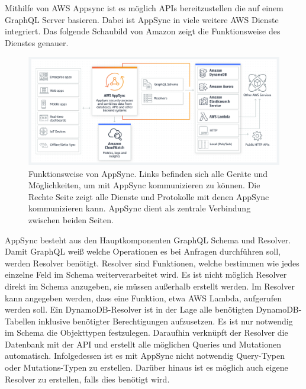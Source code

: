 Mithilfe von AWS Appsync ist es möglich APIs bereitzustellen die auf einem GraphQL Server basieren.
Dabei ist AppSync in viele weitere AWS Dienste integriert.
Das folgende Schaubild von Amazon zeigt die Funktionsweise des Dienstes genauer.
\begin{figure}[htbp]
    \centering
    \includegraphics[width=1.0\textwidth]{40-AWS/Appsync.png}
    \caption{Funktionsweise von AppSync. Links befinden sich alle Geräte und Möglichkeiten, um mit AppSync kommunizieren zu können. Die Rechte Seite zeigt alle Dienste und Protokolle mit denen AppSync kommunizieren kann. AppSync dient als zentrale Verbindung zwischen beiden Seiten. \cite{AppSync}}
    \label{fig:meine-grafik}
\end{figure}
\clearpage
\label{GraphQLResolver}
AppSync besteht aus den Hauptkomponenten GraphQL Schema und Resolver.
Damit GraphQL weiß welche Operationen es bei Anfragen durchführen soll, werden Resolver benötigt.
Resolver sind Funktionen, welche bestimmen wie jedes einzelne Feld im Schema weiterverarbeitet wird.
Es ist nicht möglich Resolver direkt im Schema anzugeben, sie müssen außerhalb erstellt werden.
Im Resolver kann angegeben werden, dass eine Funktion, etwa AWS Lambda, aufgerufen werden soll.
Ein DynamoDB-Resolver ist in der Lage alle benötigten DynamoDB-Tabellen inklusive benötigter Berechtigungen aufzusetzen.
Es ist nur notwendig im Schema die Objekttypen festzulegen.
Daraufhin verknüpft der Resolver die Datenbank mit der API und erstellt alle möglichen Queries und Mutationen automatisch.
Infolgedessen ist es mit AppSync nicht notwendig Query-Typen oder Mutations-Typen zu erstellen.
Darüber hinaus ist es möglich auch eigene Resolver zu erstellen, falls dies benötigt wird.

